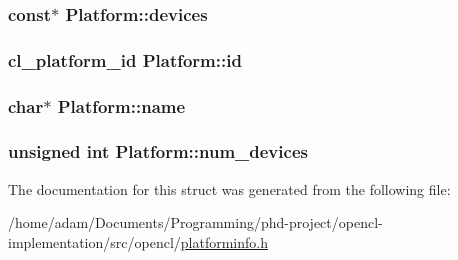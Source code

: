 \subsubsection[{devices}]{ const$\ast$ Platform\+::devices}\label{structPlatform_acdbc822eea50422804f6f8e6de359c0a}
\hypertarget{structPlatform_a4d149e964a154be9bf66784aa1638d87}{}
\subsubsection[{id}]{\setlength{\rightskip}{0pt plus 5cm}cl\+\_\+platform\+\_\+id Platform\+::id}\label{structPlatform_a4d149e964a154be9bf66784aa1638d87}
\hypertarget{structPlatform_a1a3dfb57b0d06ee67684349e1b46631e}{}
\subsubsection[{name}]{\setlength{\rightskip}{0pt plus 5cm}char$\ast$ Platform\+::name}\label{structPlatform_a1a3dfb57b0d06ee67684349e1b46631e}
\hypertarget{structPlatform_a0215aa9a2a4ce8f0ed19ad88a2b6f372}{}
\subsubsection[{num\+\_\+devices}]{\setlength{\rightskip}{0pt plus 5cm}unsigned int Platform\+::num\+\_\+devices}\label{structPlatform_a0215aa9a2a4ce8f0ed19ad88a2b6f372}


The documentation for this struct was generated from the following file\+:\begin{DoxyCompactItemize}
\item 
/home/adam/\+Documents/\+Programming/phd-\/project/opencl-\/implementation/src/opencl/\hyperlink{platforminfo_8h}{platforminfo.\+h}\end{DoxyCompactItemize}
